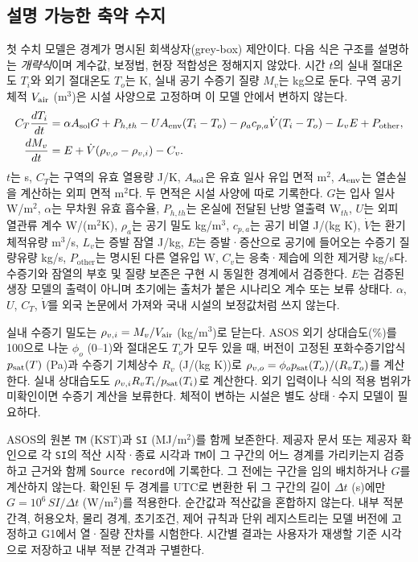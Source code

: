 \documentclass[11pt,a4paper]{article}
\begin{document}
\subsection{설명 가능한 축약 수지}
첫 수치 모델은 경계가 명시된 회색상자(grey-box) 제안이다. 다음 식은 구조를 설명하는 \emph{개략식}이며 계수값, 보정법, 현장 적합성은 정해지지 않았다. 시간 $t$의 실내 절대온도 $T_i$와 외기 절대온도 $T_o$는 K, 실내 공기 수증기 질량 $M_v$는 kg으로 둔다. 구역 공기 체적 $V_{\rm air}$ (m$^3$)은 시설 사양으로 고정하며 이 모델 안에서 변하지 않는다.
\begin{align}
C_T\frac{dT_i}{dt}
 &= \alpha A_{\rm sol} G + P_{h,th} - U A_{\rm env}(T_i-T_o)
    - \rho_a c_{p,a}\dot V(T_i-T_o) - L_v E + P_{\mathrm{other}}, \label{eq:heat}\\
\frac{dM_v}{dt}
 &= E + \dot V(\rho_{v,o}-\rho_{v,i}) - C_v. \label{eq:vapor}
\end{align}
$t$는 s, $C_T$는 구역의 유효 열용량 J/K, $A_{\rm sol}$은 유효 일사 유입 면적 m$^2$, $A_{\rm env}$는 열손실을 계산하는 외피 면적 m$^2$다. 두 면적은 시설 사양에 따로 기록한다. $G$는 입사 일사 W/m$^2$, $\alpha$는 무차원 유효 흡수율, $P_{h,th}$는 온실에 전달된 난방 열출력 W$_{th}$, $U$는 외피 열관류 계수 W/(m$^2$K), $\rho_a$는 공기 밀도 kg/m$^3$, $c_{p,a}$는 공기 비열 J/(kg K), $\dot V$는 환기 체적유량 m$^3$/s, $L_v$는 증발 잠열 J/kg, $E$는 증발·증산으로 공기에 들어오는 수증기 질량유량 kg/s, $P_{\mathrm{other}}$는 명시된 다른 열유입 W, $C_v$는 응축·제습에 의한 제거량 kg/s다. 수증기와 잠열의 부호 및 질량 보존은 구현 시 동일한 경계에서 검증한다. $E$는 검증된 생장 모델의 출력이 아니며 초기에는 출처가 붙은 시나리오 계수 또는 보류 상태다. $\alpha$, $U$, $C_T$, $\dot V$를 외국 논문에서 가져와 국내 시설의 보정값처럼 쓰지 않는다.

실내 수증기 밀도는 $\rho_{v,i}=M_v/V_{\rm air}$ (kg/m$^3$)로 닫는다. ASOS 외기 상대습도(\%)를 100으로 나눈 $\phi_o$ (0--1)와 절대온도 $T_o$가 모두 있을 때, 버전이 고정된 포화수증기압식 $p_{\rm sat}(T)$ (Pa)과 수증기 기체상수 $R_v$ (J/(kg K))로 $\rho_{v,o}=\phi_o p_{\rm sat}(T_o)/(R_vT_o)$를 계산한다. 실내 상대습도도 $\rho_{v,i}R_vT_i/p_{\rm sat}(T_i)$로 계산한다. 외기 입력이나 식의 적용 범위가 미확인이면 수증기 계산을 보류한다. 체적이 변하는 시설은 별도 상태·수지 모델이 필요하다.

ASOS의 원본 \texttt{TM} (KST)과 \texttt{SI} (MJ/m$^2$)를 함께 보존한다\cite{kma-api}. 제공자 문서 또는 제공자 확인으로 각 \texttt{SI}의 적산 시작·종료 시각과 \texttt{TM}이 그 구간의 어느 경계를 가리키는지 검증하고 근거와 함께 \texttt{Source record}에 기록한다. 그 전에는 구간을 임의 배치하거나 $G$를 계산하지 않는다. 확인된 두 경계를 UTC로 변환한 뒤 그 구간의 길이 $\Delta t$ (s)에만 $G=10^6\,SI/\Delta t$ (W/m$^2$)를 적용한다. 순간값과 적산값을 혼합하지 않는다. 내부 적분 간격, 허용오차, 물리 경계, 초기조건, 제어 규칙과 단위 레지스트리는 모델 버전에 고정하고 G1에서 열·질량 잔차를 시험한다. 시간별 결과는 사용자가 재생할 기준 시각으로 저장하고 내부 적분 간격과 구별한다.
\end{document}
